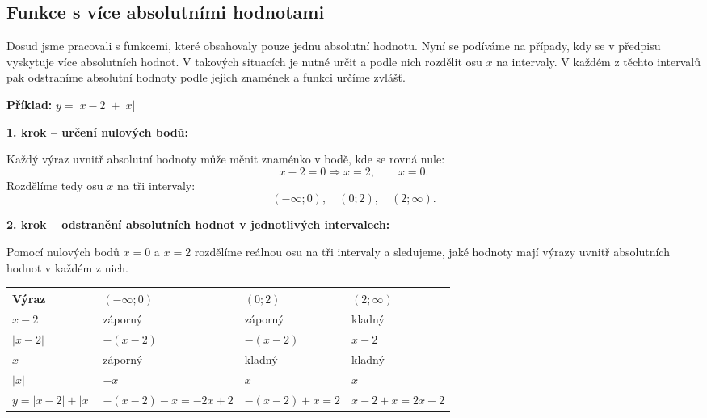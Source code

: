 \documentclass[12pt,a4paper]{article}
\begin{document}
\subsection{Funkce s více absolutními hodnotami}

Dosud jsme pracovali s funkcemi, které obsahovaly pouze jednu absolutní hodnotu.  
Nyní se podíváme na případy, kdy se v předpisu vyskytuje více absolutních hodnot.  
V takových situacích je nutné určit   
a podle nich rozdělit osu $x$ na intervaly.  
V každém z těchto intervalů pak odstraníme absolutní hodnoty podle jejich znamének a funkci určíme zvlášť.

\begin{examplebox}
\textbf{Příklad:} \(y = |x - 2| + |x|\)

\medskip
\textbf{1. krok – určení nulových bodů:}

Každý výraz uvnitř absolutní hodnoty může měnit znaménko v bodě, kde se rovná nule:
\[
x - 2 = 0 \Rightarrow x = 2, 
\qquad x = 0.
\]
Rozdělíme tedy osu $x$ na tři intervaly:
\[
(-\infty; 0), \quad (0; 2), \quad (2; \infty).
\]

\medskip
\textbf{2. krok – odstranění absolutních hodnot v jednotlivých intervalech:}

Pomocí nulových bodů $x=0$ a $x=2$ rozdělíme reálnou osu na tři intervaly a sledujeme,  
jaké hodnoty mají výrazy uvnitř absolutních hodnot v každém z nich.

\renewcommand{\arraystretch}{1.4}
\begin{center}
\begin{tabular}{|C{2.5cm}|C{2.5cm}|C{2.5cm}|C{2.5cm}|}
\hline
{} 
\textbf{Výraz} & \textbf{$(-\infty; 0)$} & \textbf{$(0; 2)$} & \textbf{$(2; \infty)$} \\ \hline
$x - 2$ & záporný & záporný & kladný \\ \hline
\(|x - 2|\) & $-(x - 2)$ & $-(x - 2)$ & $x - 2$ \\ \hline
$x$ & záporný & kladný & kladný \\ \hline
\(|x|\) & $-x$ & $x$ & $x$ \\ \hline
\textbf{$y = |x - 2| + |x|$} & $-(x - 2) - x = -2x + 2$ & $-(x - 2) + x = 2$ & $x - 2+ x = 2x - 2$ \\ \hline
\end{tabular}
\end{center}
\renewcommand{\arraystretch}{1.0}


\end{examplebox}
\end{document}
